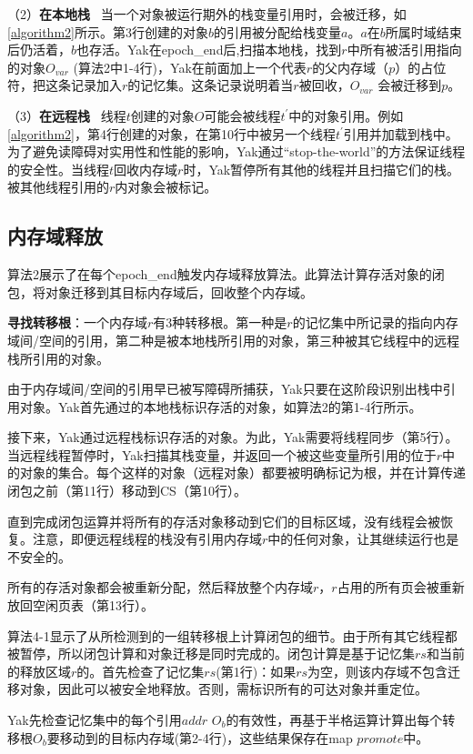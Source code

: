 （2）\textbf{在本地栈} \ 当一个对象被运行期外的栈变量引用时，会被迁移，如\ref{algorithm2}所示。第3行创建的对象$b$的引用被分配给栈变量$a$。$a$在$b$所属时域结束后仍活着，$b$也存活。Yak在epoch\_end后,扫描本地栈，找到$r$中所有被活引用指向的对象$O_{var}$ (算法2中1-4行)，Yak在前面加上一个代表$r$的父内存域（$p$）的占位符，把这条记录加入$r$的记忆集。这条记录说明着当$r$被回收，$O_{var}$ 会被迁移到$p$。

（3）\textbf{在远程栈} \ 线程$t$创建的对象$O$可能会被线程$t^{'}$中的对象引用。例如\ref{algorithm2}，第4行创建的对象，在第10行中被另一个线程$t^{'}$引用并加载到栈中。为了避免读障碍对实用性和性能的影响，Yak通过“stop-the-world”的方法保证线程的安全性。当线程$t$回收内存域$r$时，Yak暂停所有其他的线程并且扫描它们的栈。被其他线程引用的$r$内对象会被标记。

\subsection{内存域释放}
算法2展示了在每个epoch\_end触发内存域释放算法。此算法计算存活对象的闭包，将对象迁移到其目标内存域后，回收整个内存域。

\textbf{寻找转移根}：一个内存域$r$有3种转移根。第一种是$r$的记忆集中所记录的指向内存域间/空间的引用，第二种是被本地栈所引用的对象，第三种被其它线程中的远程栈所引用的对象。

由于内存域间/空间的引用早已被写障碍所捕获，Yak只要在这阶段识别出栈中引用对象。Yak首先通过的本地栈标识存活的对象，如算法2的第1-4行所示。

接下来，Yak通过远程栈标识存活的对象。为此，Yak需要将线程同步（第5行）。当远程线程暂停时，Yak扫描其栈变量，并返回一个被这些变量所引用的位于$r$中的对象的集合。每个这样的对象（远程对象）都要被明确标记为根，并在计算传递闭包之前（第11行）移动到CS（第10行）。

直到完成闭包运算并将所有的存活对象移动到它们的目标区域，没有线程会被恢复。注意，即便远程线程的栈没有引用内存域$r$中的任何对象，让其继续运行也是不安全的。

所有的存活对象都会被重新分配，然后释放整个内存域$r$，$r$占用的所有页会被重新放回空闲页表（第13行）。



算法4-1显示了从所检测到的一组转移根上计算闭包的细节。由于所有其它线程都被暂停，所以闭包计算和对象迁移是同时完成的。闭包计算是基于记忆集$rs$和当前的释放区域$r$的。首先检查了记忆集$rs$(第1行)：如果$rs$为空，则该内存域不包含迁移对象，因此可以被安全地释放。否则，需标识所有的可达对象并重定位。

Yak先检查记忆集中的每个引用${addr}$  $O_{b}$的有效性，再基于半格运算计算出每个转移根$O_{b}$要移动到的目标内存域(第2-4行)，这些结果保存在map $promote$中。

